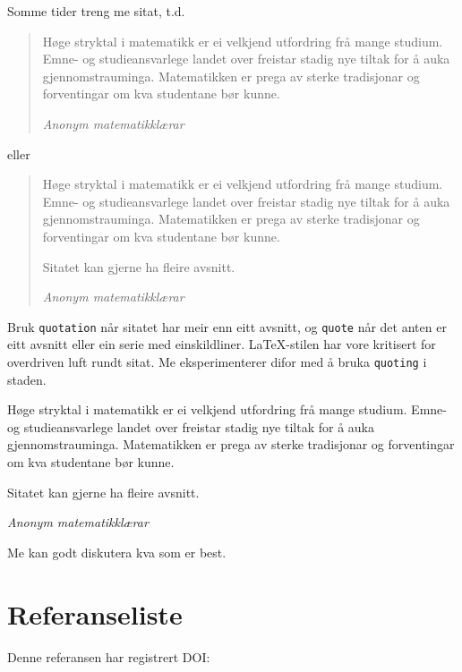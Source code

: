 \documentclass[nynorsk,journal,biblatex]{mnt}
\begin{document}
Somme tider treng me sitat, t.d.\
\begin{quote}
Høge stryktal i matematikk er ei velkjend utfordring frå mange studium.
Emne- og studieansvarlege landet over freistar 
stadig nye tiltak for å auka gjennomstrauminga.
Matematikken er prega av sterke tradisjonar og forventingar om kva
studentane bør kunne.

\raggedleft\emph{Anonym matematikklærar}
\end{quote}
eller 
\begin{quotation}
Høge stryktal i matematikk er ei velkjend utfordring frå mange studium.
Emne- og studieansvarlege landet over freistar 
stadig nye tiltak for å auka gjennomstrauminga.
Matematikken er prega av sterke tradisjonar og forventingar om kva
studentane bør kunne.

Sitatet kan gjerne ha fleire avsnitt.

\raggedleft\emph{Anonym matematikklærar}
\end{quotation}
Bruk \verb.quotation. når sitatet har meir enn eitt avsnitt, og 
\verb.quote. når det anten er eitt avsnitt eller ein serie med 
einskildliner.
\LaTeX-stilen har vore kritisert for overdriven luft rundt sitat.
Me eksperimenterer difor med å bruka \verb.quoting. i staden.
\begin{quoting}
Høge stryktal i matematikk er ei velkjend utfordring frå mange studium.
Emne- og studieansvarlege landet over freistar 
stadig nye tiltak for å auka gjennomstrauminga.
Matematikken er prega av sterke tradisjonar og forventingar om kva
studentane bør kunne.

Sitatet kan gjerne ha fleire avsnitt.

\raggedleft\emph{Anonym matematikklærar}
\end{quoting}
Me kan godt diskutera kva som er best.

\section{Referanseliste}

Denne referansen har registrert DOI: \citet{ss2008cocreation}



% 
% 
\printbibliography
\end{document}
